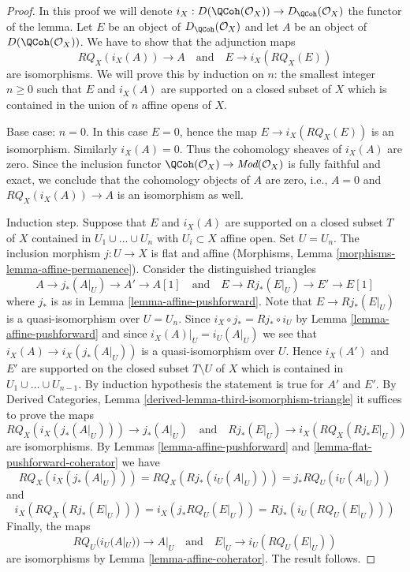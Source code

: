 \begin{proof}
In this proof we will denote $i_X : D(\QCoh(\mathcal{O}_X))
\to D_\QCoh(\mathcal{O}_X)$ the functor of the lemma.
Let $E$ be an object of $D_\QCoh(\mathcal{O}_X)$ and
let $A$ be an object of $D(\QCoh(\mathcal{O}_X))$.
We have to show that the adjunction maps
$$
RQ_X(i_X(A)) \to A
\quad\text{and}\quad
E \to i_X(RQ_X(E))
$$
are isomorphisms. We will prove this by induction on $n$:
the smallest integer $n \geq 0$ such that $E$ and $i_X(A)$
are supported on a closed subset of $X$ which
is contained in the union of $n$ affine opens of $X$.

\medskip\noindent
Base case: $n = 0$. In this case $E = 0$, hence the map
$E \to i_X(RQ_X(E))$ is an isomorphism. Similarly $i_X(A) = 0$.
Thus the cohomology sheaves of $i_X(A)$ are zero. Since the inclusion
functor $\QCoh(\mathcal{O}_X) \to \textit{Mod}(\mathcal{O}_X)$
is fully faithful and exact, we conclude that the cohomology
objects of $A$ are zero, i.e., $A = 0$ and
$RQ_X(i_X(A)) \to A$ is an isomorphism as well.

\medskip\noindent
Induction step. Suppose that $E$ and $i_X(A)$ are supported on a
closed subset $T$ of $X$ contained in $U_1 \cup \ldots \cup U_n$
with $U_i \subset X$ affine open. Set $U = U_n$. The inclusion morphism
$j : U \to X$ is flat and affine
(Morphisms, Lemma \ref{morphisms-lemma-affine-permanence}).
Consider the distinguished triangles
$$
A \to j_*(A|_U) \to A' \to A[1]
\quad\text{and}\quad
E \to Rj_*(E|_U) \to E' \to E[1]
$$
where $j_*$ is as in Lemma \ref{lemma-affine-pushforward}.
Note that $E \to Rj_*(E|_U)$ is a quasi-isomorphism over $U = U_n$.
Since $i_X \circ j_* = Rj_* \circ i_U$ by Lemma \ref{lemma-affine-pushforward}
and since $i_X(A)|_U = i_U(A|_U)$
we see that $i_X(A) \to i_X(j_*(A|_U))$ is a quasi-isomorphism over $U$.
Hence $i_X(A')$ and $E'$ are supported on the closed
subset $T \setminus U$ of $X$ which is contained in
$U_1 \cup \ldots \cup U_{n - 1}$.
By induction hypothesis the statement is true for $A'$ and $E'$. By
Derived Categories, Lemma \ref{derived-lemma-third-isomorphism-triangle}
it suffices to prove the maps
$$
RQ_X(i_X(j_*(A|_U))) \to j_*(A|_U)
\quad\text{and}\quad
Rj_*(E|_U) \to i_X(RQ_X(Rj_*E|_U))
$$
are isomorphisms. By
Lemmas \ref{lemma-affine-pushforward} and
\ref{lemma-flat-pushforward-coherator} we have
$$
RQ_X(i_X(j_*(A|_U))) = RQ_X(Rj_*(i_U(A|_U))) = j_*RQ_U(i_U(A|_U))
$$
and
$$
i_X(RQ_X(Rj_*(E|_U))) = i_X(j_*RQ_U(E|_U)) = Rj_*(i_U(RQ_U(E|_U)))
$$
Finally, the maps
$$
RQ_U(i_U(A|_U)) \to A|_U
\quad\text{and}\quad
E|_U \to i_U(RQ_U(E|_U))
$$
are isomorphisms by Lemma \ref{lemma-affine-coherator}. The result follows.
\end{proof}

